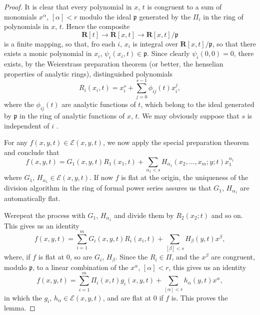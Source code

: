 \begin{proof}
  It is clear that every polynomial in $x$, $t$ is congruent to a sum of monomials $x^\alpha$, $[\alpha] < r$ modulo the ideal $\mathfrak{p}$ generated by the $\Pi_i$ in the ring of polynomials in $x$, $t$. Hence the composite
  $$
\mathbf{R} [t] \to \mathbf{R} [x,t] \to \mathbf{R} [x,t] /\mathfrak{p}
$$
is a finite mapping, so that, fro each $i$, $x_i$ is integral over $\mathbf{R} [x,t]/ \mathfrak{p}$, so that there exists a monic polynomial in $x_i$, $\psi_i (x_i,t) \in \mathfrak{p}$. Since clearly $\psi_i (0,0) = 0$, there exists, by the Weierstrass preparation theorem (or better, the henselian properties of analytic rings), distinguished polynomials
$$
R_i (x_i, t) = x^s_i + \sum\limits^{s-1}_{j=0} \phi_{ij} (t) x^{j}_i,
$$
where the $\phi_{ij}(t)$ are analytic functions of $t$, which belong to the ideal generated by $\mathfrak{p}$ in the ring of analytic functions of $x$, $t$. We may obviously suppose that $s$ is independent of $i$ .

For any $f(x, y, t) \in \mathscr{E} (x,y,t)$, we now apply the special preparation theorem and conclude that
$$
f(x,y,t) = G_1 (x,y,t) R_1 (x_1,t) + \sum\limits_{\alpha_1 < s}  H_{\alpha_1} (x_2, \ldots, x_m ; y; t) x^{\alpha_1}_1
$$
where $G_1$, $H_{\alpha_1} \in \mathscr{E} (x,y,t)$. If now $f$ is flat at the origin, the uniqueness of the division algorithm in the ring of formal power series assures us that $G_1$,  $H_{\alpha_1}$ are automatically flat.

We\pageoriginale repeat the process with $G_1$, $H_{\alpha_1}$ and divide them by $R_2 (x_2; t)$ and so on. This gives us an identity
$$
f(x,y,t) = \sum\limits^{m}_{i=1} G_i (x,y,t) R_i (x_i, t) + \sum\limits_{[\beta] < s} H_\beta (y, t) x^{\beta},
$$
where, if $f$ is flat at 0, so are $G_i$, $H_\beta$. Since the $R_i \in \Pi$, and the $x^{\beta}$ are congruent, modulo $\mathfrak{p}$, to a linear combination of the $x^{\alpha}$, $[\alpha] < r$, this gives us an identity
$$
f(x,y,t) = \sum\limits^m_{i =1 } \Pi_i (x,t) g_i (x,y,t) + \sum\limits_{[\alpha] < r} h_\alpha (y,t) x^{\alpha},
$$
in which the $g_i$, $h_\alpha  \in \mathscr{E} (x,y,t)$, and are flat at 0 if $f$ is. This proves the lemma.


\end{proof}
